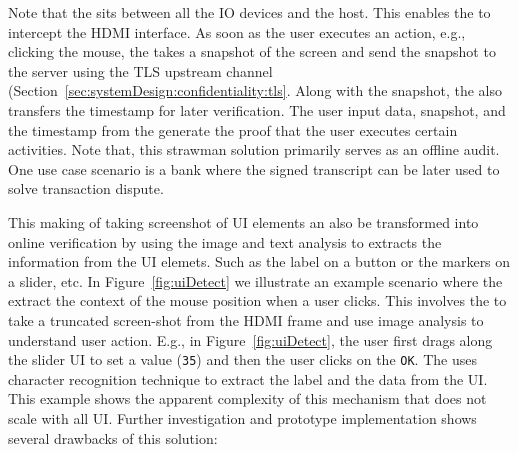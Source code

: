Note that the \device sits between all the IO devices and the host. This enables the \device to intercept the HDMI interface. As soon as the user executes an action, e.g., clicking the mouse, the \device takes a snapshot of the screen and send the snapshot to the server using the TLS upstream channel (Section~\ref{sec:systemDesign:confidentiality:tls}. Along with the snapshot, the \device also transfers the timestamp for later verification. The user input data, snapshot, and the timestamp from the \device generate the proof that the user executes certain activities. Note that, this strawman solution primarily serves as an offline audit. One use case scenario is a bank where the signed transcript can be later used to solve transaction dispute. 

This making of taking screenshot of UI elements an also be transformed into online verification by using the image and text analysis to extracts the information from the UI elemets. Such as the label on a button or the markers on a slider, etc. In Figure~\ref{fig:uiDetect} we illustrate an example scenario where the \device extract the context of the mouse position when a user clicks. This involves the \device to take a truncated screen-shot from the HDMI frame and use image analysis to understand user action. E.g., in Figure~\ref{fig:uiDetect}, \one the user first drags along the slider UI to set a value (\texttt{35}) and then \two the user clicks on the \texttt{OK}. The \device uses character recognition technique to extract the label and the data from the UI. This example shows the apparent complexity of this mechanism that does not scale with all UI. Further investigation and prototype implementation shows several drawbacks of this solution:


